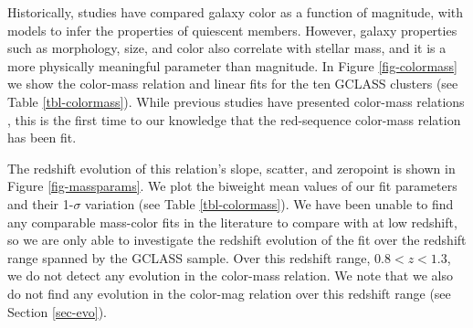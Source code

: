 Historically, studies have compared galaxy color as a function of magnitude, with models to infer the properties of quiescent members. However, galaxy properties such as morphology, size, and color also correlate with stellar mass, and it is a more physically meaningful parameter than magnitude. In Figure \ref{fig-colormass} we show the color-mass relation and linear fits for the ten GCLASS clusters (see Table \ref{tbl-colormass}). While previous studies have presented color-mass relations \citep{Borch:2006aa,Cardamone:2010aa,Huertas-Company:2010aa,Strazzullo:2010kh,Bassett:2013hq,Cimatti:2013aa,Moresco:2013aa}, this is the first time to our knowledge that the red-sequence color-mass relation has been fit.

The redshift evolution of this relation's slope, scatter, and zeropoint is shown in Figure \ref{fig-massparams}. We plot the biweight mean values of our fit parameters and their 1-$\sigma$ variation (see Table \ref{tbl-colormass}). We have been unable to find any comparable mass-color fits in the literature to compare with at low redshift, so we are only able to investigate the redshift evolution of the fit over the redshift range spanned by the GCLASS sample. Over this redshift range, $0.8 < z < 1.3$, we do not detect any evolution in the color-mass relation. We note that we also do not find any evolution in the color-mag relation over this redshift range (see Section \ref{sec-evo}).



